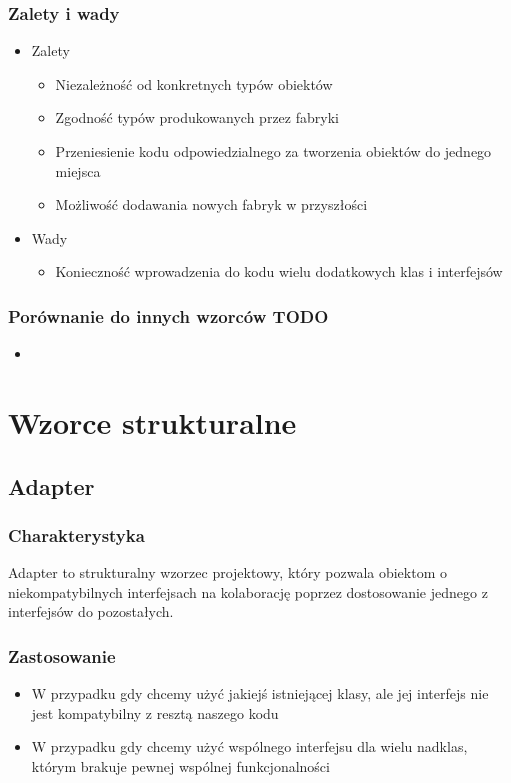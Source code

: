 \documentclass[a4paper,15pt]{article}
\begin{document}
\subsubsection{Zalety i wady}


\begin{itemize}
\item Zalety
\begin{itemize}
\item Niezależność od konkretnych typów obiektów
\item Zgodność typów produkowanych przez fabryki
\item Przeniesienie kodu odpowiedzialnego za tworzenia obiektów do jednego miejsca
\item Możliwość dodawania nowych fabryk w przyszłości
\end{itemize}
\item Wady
\begin{itemize}
\item Konieczność wprowadzenia do kodu wielu dodatkowych klas i interfejsów
\end{itemize}
\end{itemize}


\subsubsection{Porównanie do innych wzorców TODO}
\begin{itemize}
\item
\end{itemize}



\newpage
\section{Wzorce strukturalne}

\subsection{Adapter}

\subsubsection{Charakterystyka}
Adapter to strukturalny wzorzec projektowy, który pozwala obiektom o niekompatybilnych interfejsach na kolaborację poprzez dostosowanie jednego z interfejsów do pozostałych. 

\subsubsection{Zastosowanie}
\begin{itemize}
\item W przypadku gdy chcemy użyć jakiejś istniejącej klasy, ale jej interfejs nie jest kompatybilny z resztą naszego kodu
\item W przypadku gdy chcemy użyć wspólnego interfejsu dla wielu nadklas, którym brakuje pewnej wspólnej funkcjonalności
\end{itemize}
\end{document}
